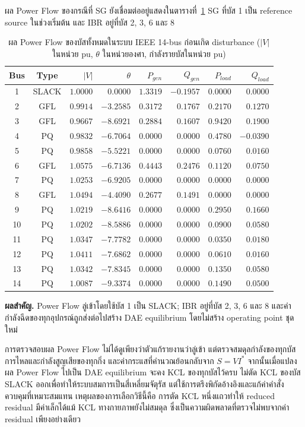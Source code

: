 \documentclass[12pt,a4paper]{article}
\newcommand{\tablefont}{\fontsize{15}{17.2}\selectfont}
\newcommand{\tableheader}{\bfseries}
\newcommand{\resultbox}[1]{\par\addvspace{0.25em}\noindent\textbf{ผลสำคัญ.} #1\par\addvspace{0.25em}}
\begin{document}
ผล Power Flow ของกรณีที่ SG ยังเชื่อมต่ออยู่แสดงในตารางที่~\ref{tab:pf_key} SG ที่บัส 1 เป็น reference source ในช่วงเริ่มต้น และ IBR อยู่ที่บัส 2, 3, 6 และ 8
\begin{table}[H]
\begin{center}
\tablefont
\caption{ผล Power Flow ของบัสทั้งหมดในระบบ IEEE 14-bus ก่อนเกิด disturbance ($|V|$ ในหน่วย pu, $\theta$ ในหน่วยองศา, กำลังรายบัสในหน่วย pu)}
\label{tab:pf_key}
\begin{tabular}{@{}c c r r r r r r@{}}
\toprule
\tableheader Bus & \tableheader Type & \tableheader $|V|$ & \tableheader $\theta$ & \tableheader $P_{gen}$ & \tableheader $Q_{gen}$ & \tableheader $P_{load}$ & \tableheader $Q_{load}$ \\
\midrule
1  & SLACK & $1.0000$ & $0.0000$ & $1.3319$ & $-0.1957$ & $0.0000$ & $0.0000$ \\
2  & GFL & $0.9914$ & $-3.2585$ & $0.3172$ & $0.1767$ & $0.2170$ & $0.1270$ \\
3  & GFL & $0.9667$ & $-8.6921$ & $0.2884$ & $0.1607$ & $0.9420$ & $0.1900$ \\
4  & PQ  & $0.9832$ & $-6.7064$ & $0.0000$ & $0.0000$ & $0.4780$ & $-0.0390$ \\
5  & PQ  & $0.9858$ & $-5.5221$ & $0.0000$ & $0.0000$ & $0.0760$ & $0.0160$ \\
6  & GFL & $1.0575$ & $-6.7136$ & $0.4443$ & $0.2476$ & $0.1120$ & $0.0750$ \\
7  & PQ  & $1.0253$ & $-6.9205$ & $0.0000$ & $0.0000$ & $0.0000$ & $0.0000$ \\
8  & GFL & $1.0494$ & $-4.4090$ & $0.2677$ & $0.1491$ & $0.0000$ & $0.0000$ \\
9  & PQ  & $1.0219$ & $-8.6416$ & $0.0000$ & $0.0000$ & $0.2950$ & $0.1660$ \\
10 & PQ  & $1.0202$ & $-8.5886$ & $0.0000$ & $0.0000$ & $0.0900$ & $0.0580$ \\
11 & PQ  & $1.0347$ & $-7.7782$ & $0.0000$ & $0.0000$ & $0.0350$ & $0.0180$ \\
12 & PQ  & $1.0411$ & $-7.6862$ & $0.0000$ & $0.0000$ & $0.0610$ & $0.0160$ \\
13 & PQ  & $1.0342$ & $-7.8345$ & $0.0000$ & $0.0000$ & $0.1350$ & $0.0580$ \\
14 & PQ  & $1.0087$ & $-9.3374$ & $0.0000$ & $0.0000$ & $0.1490$ & $0.0500$ \\
\bottomrule
\end{tabular}
\end{center}
\end{table}
\resultbox{Power Flow ลู่เข้าโดยใช้บัส 1 เป็น SLACK; IBR อยู่ที่บัส 2, 3, 6 และ 8 และค่ากำลังฉีดของทุกอุปกรณ์ถูกส่งต่อไปสร้าง DAE equilibrium โดยไม่สร้าง operating point ชุดใหม่}
การตรวจสอบผล Power Flow ไม่ได้ดูเพียงว่าตัวแก้รายงานว่าลู่เข้า แต่ตรวจสมดุลกำลังของทุกบัส การไหลและกำลังสูญเสียของทุกกิ่ง และค่ากระแสที่คำนวณย้อนกลับจาก $S=VI^{*}$ จากนั้นเมื่อแปลงผล Power Flow ไปเป็น DAE equilibrium จะคง KCL ของทุกบัสไว้ครบ ไม่ตัด KCL ของบัส SLACK ออกเพื่อทำให้ระบบสมการเป็นสี่เหลี่ยมจัตุรัส แต่ใช้การตรึงพิกัดอ้างอิงและแก้ค่าคำสั่งควบคุมที่เหมาะสมแทน เหตุผลของการเลือกวิธีนี้คือ การตัด KCL หนึ่งแถวทำให้ reduced residual มีค่าเล็กได้แม้ KCL ทางกายภาพยังไม่สมดุล ซึ่งเป็นความผิดพลาดที่ตรวจไม่พบจากค่า residual เพียงอย่างเดียว
\end{document}
